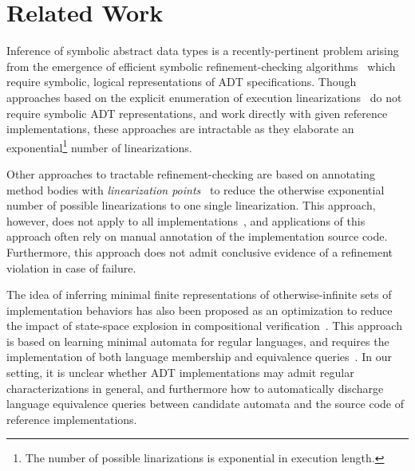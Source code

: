 \section{Related Work}
\label{sec:related}

Inference of symbolic abstract data types is a recently-pertinent problem
arising from the emergence of efficient symbolic refinement-checking
algorithms~\cite{conf/popl/BouajjaniEEH15, conf/pldi/EmmiEH15} which require
symbolic, logical representations of ADT specifications. Though approaches
based on the explicit enumeration of execution
linearizations~\cite{journals/jpdc/WingG93, conf/pldi/BurckhardtDMT10,
conf/asplos/BurnimNS11, conf/kbse/ZhangCW13} do not require symbolic ADT
representations, and work directly with given reference implementations, these
approaches are intractable as they elaborate an exponential\footnote{The number
of possible linarizations is exponential in execution length.} number of
linearizations.

Other approaches to tractable refinement-checking are based on annotating
method bodies with \emph{linearization
points}~\cite{journals/toplas/HerlihyW90, conf/cav/AmitRRSY07,
conf/fm/LiuCLS09, conf/cav/Vafeiadis10, conf/podc/OHearnRVYY10,
conf/icse/Zhang11a, conf/oopsla/ShachamBASVY11, conf/cav/DragoiGH13,
conf/pldi/LiangF13} to reduce the otherwise exponential number of possible
linearizations to one single linearization. This approach, however, does not
apply to all implementations~\cite{journals/toplas/HerlihyW90}, and
applications of this approach often rely on manual annotation of the
implementation source code. Furthermore, this approach does not admit
conclusive evidence of a refinement violation in case of failure.

The idea of inferring minimal finite representations of otherwise-infinite sets
of implementation behaviors has also been proposed as an optimization to reduce
the impact of state-space explosion in compositional
verification~\cite{journals/ase/GiannakopoulouPB05}. This approach is based on
learning minimal automata for regular languages, and requires the
implementation of both language membership and equivalence
queries~\cite{journals/iandc/Angluin87}. In our setting, it is unclear whether
ADT implementations may admit regular characterizations in general, and
furthermore how to automatically discharge language equivalence queries between
candidate automata and the source code of reference implementations.

